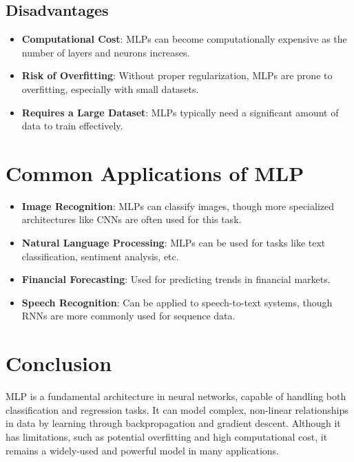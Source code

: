 \documentclass{article}
\begin{document}
	\subsection{Disadvantages}
	\begin{itemize}
		\item \textbf{Computational Cost}: MLPs can become computationally expensive as the number of layers and neurons increases.
		\item \textbf{Risk of Overfitting}: Without proper regularization, MLPs are prone to overfitting, especially with small datasets.
		\item \textbf{Requires a Large Dataset}: MLPs typically need a significant amount of data to train effectively.
	\end{itemize}
	
	\section{Common Applications of MLP}
	\begin{itemize}
		\item \textbf{Image Recognition}: MLPs can classify images, though more specialized architectures like CNNs are often used for this task.
		\item \textbf{Natural Language Processing}: MLPs can be used for tasks like text classification, sentiment analysis, etc.
		\item \textbf{Financial Forecasting}: Used for predicting trends in financial markets.
		\item \textbf{Speech Recognition}: Can be applied to speech-to-text systems, though RNNs are more commonly used for sequence data.
	\end{itemize}
	
	\section{Conclusion}
	MLP is a fundamental architecture in neural networks, capable of handling both classification and regression tasks. It can model complex, non-linear relationships in data by learning through backpropagation and gradient descent. Although it has limitations, such as potential overfitting and high computational cost, it remains a widely-used and powerful model in many applications.
	
\end{document}
